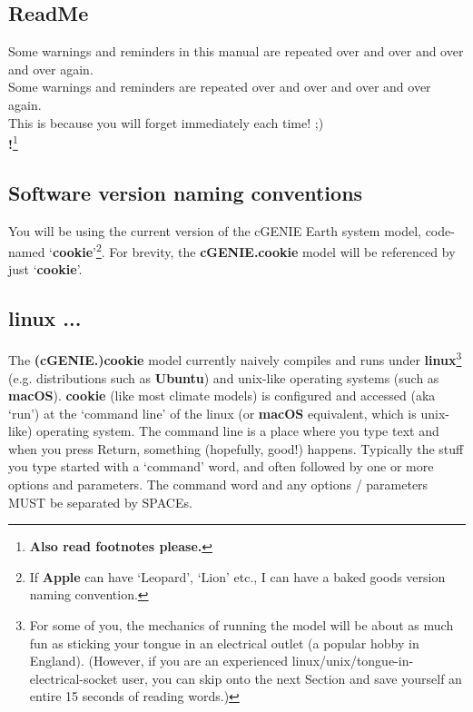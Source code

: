 
\subsection*{ReadMe}

Some warnings and reminders in this manual are repeated over and over and over and over again.
\\Some warnings and reminders are repeated over and over and over and over again.
\\This is because you will forget immediately each time! ;)
\\\textbf{!}\footnote{\textbf{Also read footnotes please.}}


\subsection*{Software version naming conventions}

You will be using the current version of the cGENIE Earth system model, code-named ‘\textbf{cookie}’\footnote{If \textbf{Apple} can have ‘Leopard’, ‘Lion’ etc., I can have a baked goods version naming convention.}. For brevity, the \textbf{cGENIE.cookie} model will be referenced by just ‘\textbf{cookie}’.


\subsection*{linux ...}

The \textbf{(cGENIE.)cookie} model currently naively compiles and runs under \textbf{linux}\footnote{For some of you, the mechanics of running the model will be about as much fun as sticking your tongue in an electrical outlet (a popular hobby in England). (However, if you are an experienced linux/unix/tongue-in-electrical-socket user, you can skip onto the next Section and save yourself an entire 15 seconds of reading words.)} (e.g. distributions such as \textbf{Ubuntu}) and unix-like operating systems (such as \textbf{macOS}). \textbf{cookie} (like most climate models) is configured and accessed (aka ‘run') at the ‘command line’ of the linux (or \textbf{macOS} equivalent, which is unix-like) operating system. The command line is a place where you type text and when you press \small\textsf{Return}\normalsize, something (hopefully, good!) happens. Typically the stuff you type started with a ‘command’ word, and often followed by one or more options and parameters. The command word and any options / parameters MUST be separated by SPACEs.

